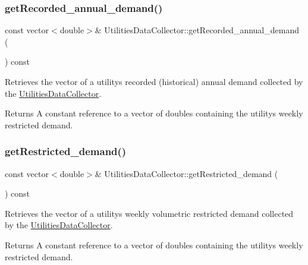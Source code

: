 \subsubsection{\texorpdfstring{get\+Recorded\+\_\+annual\+\_\+demand()}{getRecorded\_annual\_demand()}}
{\footnotesize\ttfamily const vector$<$double$>$\& Utilities\+Data\+Collector\+::get\+Recorded\+\_\+annual\+\_\+demand (\begin{DoxyParamCaption}{ }\end{DoxyParamCaption}) const}



Retrieves the vector of a utility\textquotesingle{}s recorded (historical) annual demand collected by the {\ttfamily \mbox{\hyperlink{classUtilitiesDataCollector}{Utilities\+Data\+Collector}}}. 

\begin{DoxyReturn}{Returns}
A constant reference to a vector of doubles containing the utility\textquotesingle{}s weekly restricted demand. 
\end{DoxyReturn}
\mbox{\label{classUtilitiesDataCollector_a78421c65929a05cd1312006bca24e658}} 
\subsubsection{\texorpdfstring{get\+Restricted\+\_\+demand()}{getRestricted\_demand()}}
{\footnotesize\ttfamily const vector$<$double$>$\& Utilities\+Data\+Collector\+::get\+Restricted\+\_\+demand (\begin{DoxyParamCaption}{ }\end{DoxyParamCaption}) const}



Retrieves the vector of a utility\textquotesingle{}s weekly volumetric restricted demand collected by the {\ttfamily \mbox{\hyperlink{classUtilitiesDataCollector}{Utilities\+Data\+Collector}}}. 

\begin{DoxyReturn}{Returns}
A constant reference to a vector of doubles containing the utility\textquotesingle{}s weekly restricted demand. 
\end{DoxyReturn}
\mbox{\label{classUtilitiesDataCollector_aa9bc5b8d31c3a0bec03906cded8c0cf4}} 
